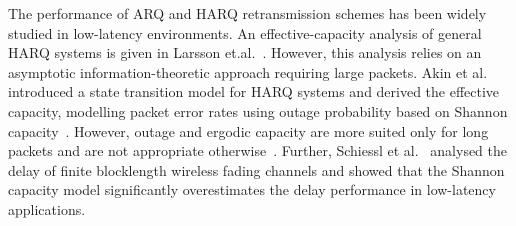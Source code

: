
The performance of ARQ and HARQ retransmission schemes has been widely studied in low-latency environments. 
An effective-capacity\cite{wu2003effectiveCap} analysis of general HARQ systems is given in Larsson et.al.~\cite{larsson2016HARQ}. However, this analysis relies on an asymptotic information-theoretic approach requiring large packets\cite{devassy2019reliable}.
Akin et al.~\cite{akin2015backlog} introduced a state transition model for HARQ systems and derived the effective capacity, modelling packet error rates using outage probability based on Shannon capacity~\cite{Shannon}. However, outage and ergodic capacity are more suited only for long packets and are not appropriate otherwise~\cite{durisi2016URLLC}. 
Further, Schiessl et al.~\cite{schiessl2015delay} analysed the delay of finite blocklength wireless fading channels and showed that the Shannon capacity model significantly overestimates the delay performance in low-latency applications. 


